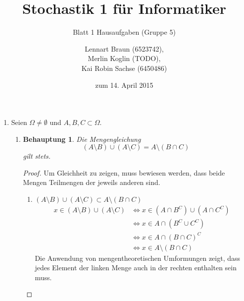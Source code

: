 \documentclass[a4paper]{scrartcl}
\title{Stochastik 1 für Informatiker}
\subtitle{Blatt 1 Hausaufgaben (Gruppe 5)}
\author{
    Lennart Braun (6523742), \\
    Merlin Koglin (TODO), \\
    Kai Robin Sachse (6450486)
}
\date{zum 14. April 2015}
\newtheorem*{behaupt}{Behauptung}
\newcommand{\gdw}{\Leftrightarrow}
\begin{document}
\maketitle

\begin{enumerate}[label=\bfseries\arabic*.]
    \item
        Seien $\Omega \neq \emptyset$ und $A,B,C \subset \Omega$.
        \begin{enumerate}[label=(\alph*)]
            \item
                \begin{behaupt}
                    Die Mengengleichung
                    \begin{equation}
                        (A \setminus B) \cup (A \setminus C)
                        = A \setminus (B \cap C)
                    \end{equation}
                    gilt stets.
                \end{behaupt}
                \begin{proof}
                    Um Gleichheit zu zeigen, muss bewiesen werden, dass beide
                    Mengen Teilmengen der jeweils anderen sind.
                    \begin{enumerate}
                        \item
                            $(A \setminus B) \cup (A \setminus C)
                            \subset A \setminus (B \cap C)$ \\
                            \begin{equation}
                                \begin{split}
                                    x \in (A \setminus B) \cup (A \setminus C)
                                    &\gdw x \in (A \cap B^C) \cup (A \cap C^C)\\
                                    &\gdw x \in A \cap (B^C \cup C^C) \\
                                    &\gdw x \in A \cap (B \cap C)^C \\
                                    &\gdw x \in A \setminus (B \cap C)
                                \end{split}
                            \end{equation}
                            Die Anwendung von mengentheoretischen Umformungen
                            zeigt, dass jedes Element der linken Menge auch in
                            der rechten enthalten sein muss.


\end{enumerate}
\end{proof}
\end{enumerate}
\end{enumerate}
\end{document}
